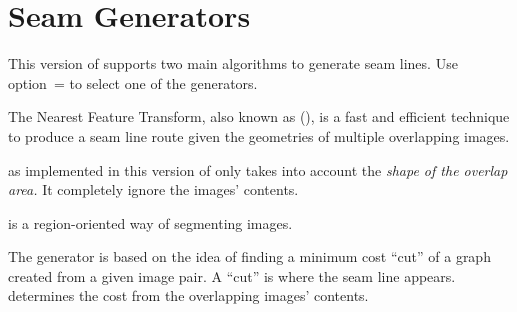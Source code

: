 

\chapter[Seam Generators]{\label{sec:seam-generators}%
  Seam Generators}

This version of \App{} supports two main algorithms to generate seam lines.  Use
option~= to select one of the generators.

\begin{description}
\item[Nearest Feature Transform (\acronym{NFT})]%
\itemx[\metavar{ALGORITHM}=\code{nearest-feature-transform}]\itemend
  The Nearest Feature Transform\footnotemark{}, also known as
   (), is a fast and efficient
  technique to produce a seam line route given the geometries of multiple overlapping images.%

   as implemented in this version of \App{} only takes into account the \emph{shape
    of the overlap area.}  It completely ignore the images' contents.

\item[Graph-Cut (\acronym{GC})]%
\itemx[\metavar{ALGORITHM}=\code{graph-cut}]\itemend
   is a region-oriented way of segmenting images.

  The generator is based on the idea of finding a minimum cost ``cut'' of a graph created from a
  given image pair.  A ``cut'' is where the seam line appears.   determines the cost
  from the overlapping images' contents.
\end{description}

